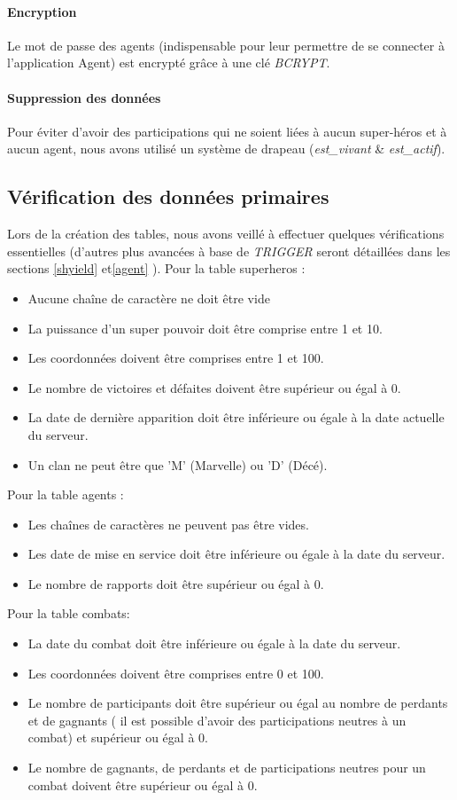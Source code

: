 \documentclass{article}[12pt]
\begin{document}
	\paragraph{Encryption}
	Le mot de passe des agents (indispensable pour leur permettre de se connecter à l'application Agent) est encrypté grâce à une clé \textit{BCRYPT}.
	\paragraph{Suppression des données}
	Pour éviter d'avoir des participations qui ne soient liées à aucun super-héros et à aucun agent, nous avons utilisé un système de drapeau (\textit{est\_vivant} \& \textit{est\_actif}).
	
	\subsection{Vérification des données primaires}
	Lors de la création des tables, nous avons veillé à effectuer quelques vérifications essentielles (d'autres plus avancées à base de \textit{TRIGGER} seront détaillées dans les sections \ref{shyield} et\ref{agent} ).
	Pour la table superheros : 
	\begin{itemize}
		\item Aucune chaîne de caractère ne doit être vide
		\item La puissance d'un super pouvoir doit être comprise entre 1 et 10.
		\item Les coordonnées doivent être comprises entre 1 et 100.
		\item Le nombre de victoires et défaites doivent être supérieur ou égal à 0.
		\item La date de dernière apparition doit être inférieure ou égale à la date actuelle du serveur.
        \item Un clan ne peut être que 'M' (Marvelle) ou 'D' (Décé).
	\end{itemize}
	Pour la table agents :
	\begin{itemize}
		\item Les chaînes de caractères ne peuvent pas être vides.
		\item Les date de mise en service doit être inférieure ou égale à la date du serveur.
		\item Le nombre de rapports doit être supérieur ou égal à 0.
	\end{itemize}
	Pour la table combats:
	\begin{itemize}
		\item La date du combat doit être inférieure  ou égale à la date du serveur.
		\item Les coordonnées doivent être comprises entre 0 et 100.
		\item Le nombre de participants doit être supérieur ou égal au nombre de perdants et de gagnants ( il est possible d'avoir des participations neutres à un combat) et supérieur ou égal à 0.
		\item Le nombre de gagnants, de perdants et de participations neutres pour un combat doivent être supérieur ou égal à 0.
	\end{itemize}
\end{document}
